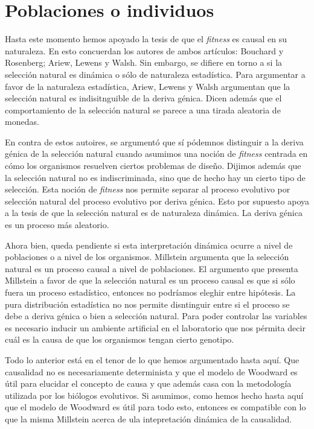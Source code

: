 \section{Poblaciones o individuos}

Hasta este momento hemos apoyado la tesis de que el \emph{fitness} es causal en su naturaleza. En esto concuerdan los autores de ambos artículos: Bouchard y Rosenberg; Ariew, Lewens y Walsh. Sin embargo, se difiere en torno a si la selección natural es dinámica o sólo de naturaleza estadística. Para argumentar a favor de la naturaleza estadística, Ariew, Lewens y Walsh argumentan que la selección natural es indisitnguible de la deriva génica. Dicen además que el comportamiento de la selección natural se parece a una tirada aleatoria de monedas.

En contra de estos autoires, se argumentó que sí pódemnos distinguir a la deriva génica de la selección natural cuando asumimos una noción de \emph{fitness} centrada en cómo los organismos resuelven ciertos problemas de diseño. Dijimos además que la selección natural no es indiscriminada, sino que de hecho hay un cierto tipo de selección. Esta noción de \emph{fitness} nos permite separar al proceso evolutivo por selección natural del proceso evolutivo por deriva génica. Esto por supuesto apoya a la tesis de que la selección natural es de naturaleza dinámica. La deriva génica es un proceso más aleatorio.

Ahora bien, queda pendiente si esta interpretación dinámica ocurre a nivel de poblaciones o a nivel de los organismos. Millstein \citeyear{Millstein2006} argumenta que la selección natural es un proceso causal a nivel de poblaciones. El argumento que presenta Millstein a favor de que la selección natural es un proceso causal es que si sólo fuera un proceso estadístico, entonces no podríamos eleghir entre hipótesis. La pura distribución estadística no nos permite disntinguir entre si el proceso se debe a deriva génica o bien a selección natural. Para poder controlar las variables es necesario inducir un ambiente artificial en el laboratorio que nos pérmita decir cuál es la causa de que los organismos tengan cierto genotipo.

Todo lo anterior está en el tenor de lo que hemos argumentado hasta aquí. Que causalidad no es necesariamente determinista y que el modelo de Woodward es útil para elucidar el concepto de causa y que además casa con la metodología utilizada por los biólogos evolutivos. Si asumimos, como hemos hecho hasta aquí que el modelo de Woodward es útil para todo esto, entonces es compatible con lo que la misma Millstein acerca de ula intepretación dinámica de la causalidad.

